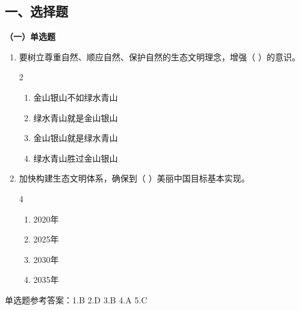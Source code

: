 \documentclass[a4paper,11pt]{ctexart}
\begin{document}
\subsection{一、选择题}

\textbf{（一）单选题}
\begin{enumerate}
    \item 要树立尊重自然、顺应自然、保护自然的生态文明理念，增强（ ）的意识。
    \begin{multicols}{2}
    \begin{enumerate}
        \item 金山银山不如绿水青山
        \item 绿水青山就是金山银山
        \item 金山银山就是绿水青山
        \item 绿水青山胜过金山银山
    \end{enumerate}
    \end{multicols}
    
    \item 加快构建生态文明体系，确保到（ ）美丽中国目标基本实现。
    \begin{multicols}{4}
    \begin{enumerate}
        \item 2020年
        \item 2025年
        \item 2030年
        \item 2035年
    \end{enumerate}
    \end{multicols}
\end{enumerate}

\begin{answerbox}
单选题参考答案：1.B \quad 2.D \quad 3.B \quad 4.A \quad 5.C
\end{answerbox}
\end{document}
